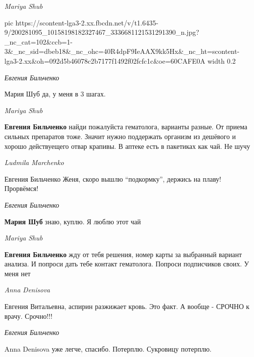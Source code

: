 \emph{Mariya Shub}

\ifcmt
  pic https://scontent-lga3-2.xx.fbcdn.net/v/t1.6435-9/200281095_10158198182327467_3336681121531291390_n.jpg?_nc_cat=102&ccb=1-3&_nc_sid=dbeb18&_nc_ohc=40R4dpF9IeAAX9kk5Hx&_nc_ht=scontent-lga3-2.xx&oh=092d5b46078c2b7177f1492f02fcfc1c&oe=60CAFE0A
	width 0.2
\fi

\emph{Евгения Бильченко}

Мария Шуб да, у меня в 3 шагах.

\emph{Mariya Shub}

\textbf{Евгения Бильченко} найди пожалуйста гематолога, варианты разные. От приема
сильных препаратов тоже. Значит нужно поддержать организм из дешёвого и хорошо
действуещего отвар крапивы. В аптеке есть в пакетиках как чай. Не шучу

\emph{Ludmila Marchenko}

Евгения Бильченко Женя, скоро вышлю \enquote{подкормку}, держись на плаву! Прорвёмся!

\emph{Евгения Бильченко}

\textbf{Мария Шуб} знаю, куплю. Я люблю этот чай

\emph{Mariya Shub}

\textbf{Евгения Бильченко} жду от тебя решения, номер карты за выбранный вариант
анализа. И попроси дать тебе контакт гематолога. Попроси подписчиков своих. У
меня нет

\emph{Anna Denisova}

Евгения Витальевна, аспирин разжижает кровь. Это факт. А вообще - СРОЧНО к
врачу. Срочно!!!

\emph{Евгения Бильченко}

Anna Denisova уже легче, спасибо. Потерплю. Сукровицу потерплю.
